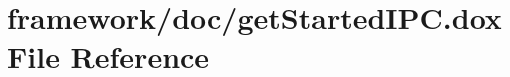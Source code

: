 \hypertarget{get_started_i_p_c_8dox}{}\section{framework/doc/get\+Started\+I\+PC.dox File Reference}
\label{get_started_i_p_c_8dox}
